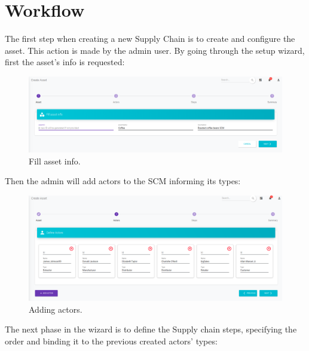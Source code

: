 \section{Workflow}\label{sec:workflow}

The first step when creating a new Supply Chain  is to create and configure the asset. This action is made by the admin user. By going through the setup wizard, first the asset's info is requested:

\begin{figure}[H]
\begin{center}
  \includegraphics[scale=0.27]{images/use_example/01_create_asset_1.png}
\caption{Fill asset info.}
\label{fig:create_asset_1}
\end{center}
\end{figure}

Then the admin will add actors to the SCM informing its types:

\begin{figure}[H]
\begin{center}
  \includegraphics[scale=0.27]{images/use_example/02_create_asset_2.png}
\caption{Adding actors.}
\label{fig:create_asset_2}
\end{center}
\end{figure}


The next phase in the wizard is to define the Supply chain steps, specifying the order and binding it to the previous created actors' types:

